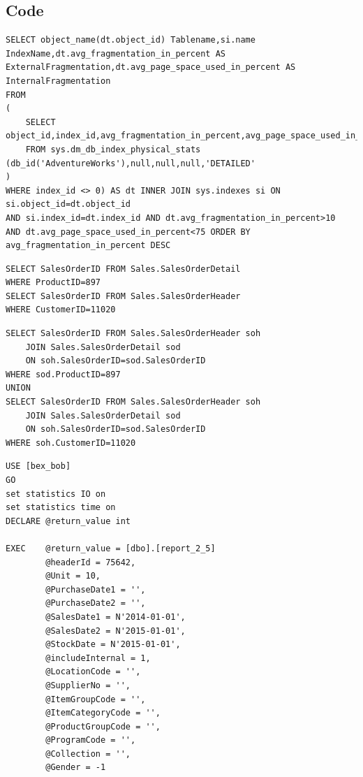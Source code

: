 \documentclass{cslthse-msc}
\begin{document}


\begin{appendices}

\chapter{Code} \label{appCode}
\begin{lstlisting}[caption={Algorithm to find fragmented tables and the fragmentation values},label=See DB-Fragmentation]
SELECT object_name(dt.object_id) Tablename,si.name
IndexName,dt.avg_fragmentation_in_percent AS
ExternalFragmentation,dt.avg_page_space_used_in_percent AS
InternalFragmentation
FROM
(
    SELECT object_id,index_id,avg_fragmentation_in_percent,avg_page_space_used_in_percent
    FROM sys.dm_db_index_physical_stats (db_id('AdventureWorks'),null,null,null,'DETAILED'
)
WHERE index_id <> 0) AS dt INNER JOIN sys.indexes si ON si.object_id=dt.object_id
AND si.index_id=dt.index_id AND dt.avg_fragmentation_in_percent>10
AND dt.avg_page_space_used_in_percent<75 ORDER BY avg_fragmentation_in_percent DESC
\end{lstlisting}


\begin{lstlisting}[caption={Example of broken-down query, instead of OR operator in WHERE clause on two different tables},label=firstbreak-down]
SELECT SalesOrderID FROM Sales.SalesOrderDetail
WHERE ProductID=897
SELECT SalesOrderID FROM Sales.SalesOrderHeader
WHERE CustomerID=11020
\end{lstlisting}
\newpage

\begin{lstlisting}[caption={UNION instead of OR},label=second-down]
SELECT SalesOrderID FROM Sales.SalesOrderHeader soh
	JOIN Sales.SalesOrderDetail sod
	ON soh.SalesOrderID=sod.SalesOrderID
WHERE sod.ProductID=897
UNION
SELECT SalesOrderID FROM Sales.SalesOrderHeader soh
	JOIN Sales.SalesOrderDetail sod
	ON soh.SalesOrderID=sod.SalesOrderID
WHERE soh.CustomerID=11020
\end{lstlisting} 


\begin{lstlisting}[caption={SQL batch to execute stored procedure report\_2\_5},label=spexec]
USE [bex_bob]
GO
set statistics IO on
set statistics time on
DECLARE	@return_value int

EXEC	@return_value = [dbo].[report_2_5]
		@headerId = 75642,
		@Unit = 10,
		@PurchaseDate1 = '',
		@PurchaseDate2 = '',
		@SalesDate1 = N'2014-01-01',
		@SalesDate2 = N'2015-01-01',
		@StockDate = N'2015-01-01',
		@includeInternal = 1,
		@LocationCode = '',
		@SupplierNo = '',
		@ItemGroupCode = '',
		@ItemCategoryCode = '',
		@ProductGroupCode = '',
		@ProgramCode = '',
		@Collection = '',
		@Gender = -1


\end{lstlisting}
\end{appendices}
\end{document}
